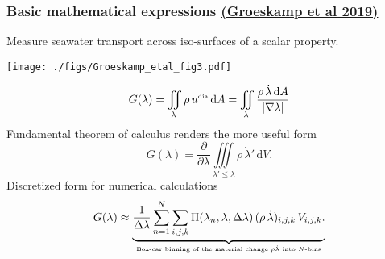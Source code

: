 \documentclass[10pt]{beamer}
\begin{document}
\begin{frame}
  \frametitle{Basic mathematical expressions
\small \href{https://www.annualreviews.org/doi/abs/10.1146/annurev-marine-010318-095421}{(Groeskamp et al 2019)}
}

{\sc Measure seawater transport across iso-surfaces of a scalar property.}  

\begin{center}
\vspace{-.1cm}
{\texttt{[image: ./figs/Groeskamp\_etal\_fig3.pdf]}}
\end{center}
\vspace{-.5cm}


\begin{equation}
G(\lambda) = \iint\limits_{\lambda} \rho \, u^{\mbox{\tiny dia}} \, \mathrm{d}A = 
\iint\limits_{\lambda} \frac{\rho \, \dot{\lambda} \, \mathrm{d}A}{|\nabla \lambda|}
\label{eq:wmt-defined-math}
\end{equation}
 Fundamental theorem of calculus renders the more useful form 
\begin{equation}
G(\lambda) = 
\frac{\partial}{\partial \lambda}
\iiint\limits_{\lambda' \le \lambda}
\rho \, \dot{\lambda}' \, \mathrm{d}V.
\label{eq:wmt-identity-math}
\end{equation}
Discretized form for numerical calculations 
\begin{equation}
G(\lambda) 
\approx 
\underbrace{
  \frac{1}{\Delta \lambda} \sum_{n=1}^{N} \sum_{i,j,k}
  \Pi(\lambda_{n},\lambda,\Delta \lambda)
  \, (\rho \, \dot{\lambda})_{i,j,k} \, V_{i,j,k}.
}_{\mbox{\tiny Box-car binning of the material change $\rho \dot{\lambda}$  into $N$-bins}}
\label{eq:wmt-discrete-math}
\end{equation}


\end{frame}
\end{document}
